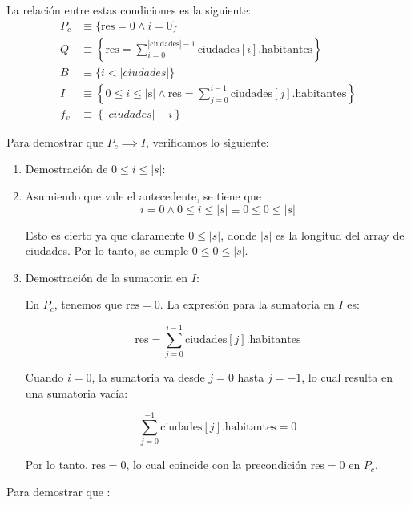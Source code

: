 \documentclass[10pt,a4paper]{article}
\begin{document}
La relación entre estas condiciones es la siguiente:
%
\begin{align*}
	P_c & \equiv \{ \text{res} = 0 \land i = 0 \}                                                                                   \\
	Q   & \equiv \left\{ \text{res} = \sum_{i=0}^{|\text{ciudades}|-1} \text{ciudades}[i].\text{habitantes} \right\}                \\
	B   & \equiv \{ i < |ciudades| \}                                                                                               \\
	I   & \equiv \left\{ 0 \leq i \leq |\text{s}| \land \text{res} = \sum_{j=0}^{i-1} \text{ciudades}[j].\text{habitantes} \right\} \\
	f_v & \equiv \left\{ |ciudades| - i \right\}
\end{align*}

Para demostrar que \( P_c \implies I \), verificamos lo siguiente:

\begin{enumerate}
	\item Demostración de \( 0 \leq i \leq |s| \):
	\item
	      Asumiendo que vale el antecedente, se tiene que
	      \[
		      i = 0 \land 0 \leq i \leq |s| \equiv 0 \leq 0 \leq |s|
	      \]

	      Esto es cierto ya que claramente \( 0 \leq |s| \), donde \( |s| \) es la longitud del array de ciudades. Por lo tanto, se cumple \( 0 \leq 0 \leq |s| \).

	\item Demostración de la sumatoria en \( I \):

	      En \( P_c \), tenemos que \( \text{res} = 0 \). La expresión para la sumatoria en \( I \) es:

	      \[
		      \text{res} = \sum_{j=0}^{i-1} \text{ciudades}[j].\text{habitantes}
	      \]

	      Cuando \( i = 0 \), la sumatoria va desde \( j = 0 \) hasta \( j = -1 \), lo cual resulta en una sumatoria vacía:

	      \[
		      \sum_{j=0}^{-1} \text{ciudades}[j].\text{habitantes} = 0
	      \]

	      Por lo tanto, \( \text{res} = 0 \), lo cual coincide con la precondición \( \text{res} = 0 \) en \( P_c \).
\end{enumerate}
\pagebreak

Para demostrar que :
\end{document}
